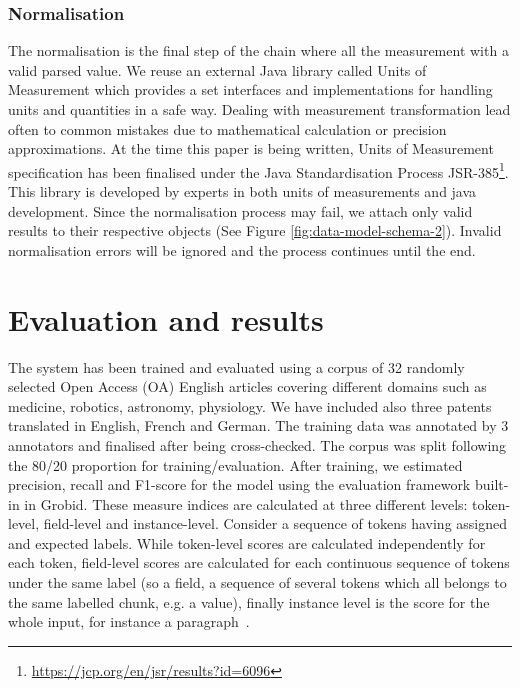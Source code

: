 \documentclass[sigconf]{acmart}
\begin{document}
\subsubsection{Normalisation}

The normalisation is the final step of the chain where all the measurement with a valid parsed value. We reuse an external Java library called Units of Measurement which provides a set interfaces and implementations for handling units and quantities in a safe way. Dealing with measurement transformation lead often to common mistakes due to mathematical calculation or precision approximations. At the time this paper is being written, Units of Measurement specification has been finalised under the Java Standardisation Process JSR-385\footnote{\url{https://jcp.org/en/jsr/results?id=6096}}. This library is developed by experts in both units of measurements and java development. 
Since the normalisation process may fail, we attach only valid results to their respective objects (See Figure \ref{fig:data-model-schema-2}). Invalid normalisation errors will be ignored and the process continues until the end. 


\section{Evaluation and results}

The system has been trained and evaluated using a corpus of 32 randomly selected Open Access (OA) English articles covering different domains such as medicine, robotics, astronomy, physiology. We have included also three patents translated in English, French and German. The training data was annotated by 3 annotators and finalised after being cross-checked. 
The corpus was split following the 80/20 proportion for training/evaluation. After training, we estimated precision, recall and F1-score for the model using the evaluation framework built-in in Grobid. These measure indices are calculated at three different levels: token-level, field-level and instance-level. Consider a sequence of tokens having assigned and expected labels. While token-level scores are calculated independently for each token, field-level scores are calculated for each continuous sequence of tokens under the same label (so a field, a sequence of several tokens which all belongs to the same labelled chunk, e.g. a value), finally instance level is the score for the whole input, for instance a paragraph~\cite{foppiano2019proposal}. 
\end{document}

